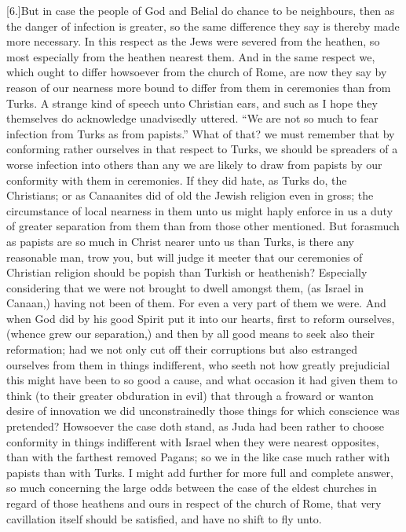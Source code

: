 [6.]But in case the people of God and Belial do chance to be neighbours, then as the danger of infection is greater, so the same difference they say is thereby made more necessary. In this respect as the Jews were severed from the heathen, so most especially from the heathen nearest them. And in the same respect we, which ought to differ howsoever from the church of Rome, are now they say by reason of our nearness more bound to differ from them in ceremonies than from Turks. A strange kind of speech unto Christian ears, and such as I hope they themselves do acknowledge unadvisedly uttered. “We are not so much to fear infection from Turks as from papists.” What of that? we must remember that by conforming rather ourselves in that respect to Turks, we should be spreaders of a worse infection into others than any we are likely to draw from papists by our conformity with them in ceremonies. If they did hate, as Turks do, the Christians; or as Canaanites did of old the Jewish religion even in gross; the circumstance of local nearness in them unto us might haply enforce in us a duty of greater separation from them than from those other mentioned. But forasmuch as papists are so much in Christ nearer unto us than Turks, is there any reasonable man, trow you, but will judge it meeter that our ceremonies of Christian religion should be popish than Turkish or heathenish? Especially considering that we were not brought to dwell amongst them, (as Israel in Canaan,) having not been of them. For even a very part of them we were. And when God did by his good Spirit put it into our hearts, first to reform ourselves, (whence grew our separation,) and then by all good means to seek also their reformation; had we not only cut off their corruptions but also estranged ourselves from them in things indifferent, who seeth not how greatly prejudicial this might have been to  so good a cause, and what occasion it had given them to think (to their greater obduration in evil) that through a froward or wanton desire of innovation we did unconstrainedly those things for which conscience was pretended? Howsoever the case doth stand, as Juda had been rather to choose conformity in things indifferent with Israel when they were nearest opposites, than with the farthest removed Pagans; so we in the like case much rather with papists than with Turks. I might add further for more full and complete answer, so much concerning the large odds between the case of the eldest churches in regard of those heathens and ours in respect of the church of Rome, that very cavillation itself should be satisfied, and have no shift to fly unto.

